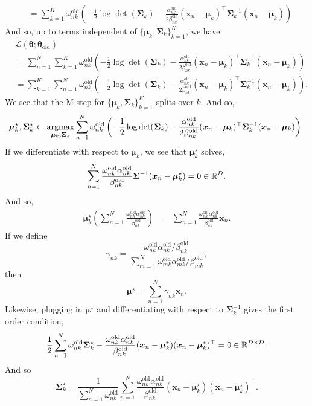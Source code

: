 \begin{enumerate}[label = (\alph*)]
\begin{align*}
        &=\sum_{k=1}^K \omega_{nk}^{\mathrm{old}}\left(-\frac{1}{2}\log \det(\bm{\Sigma}_k) - \frac{\alpha_{nk}^{\mathrm{old}}}{2\beta_{nk}^{\mathrm{old}}}(\bm{x}_n - \bm{\mu}_k)^\top \bm{\Sigma}_k^{-1}(\bm{x}_n - \bm{\mu}_k) \right)
    \end{align*}
    And so, up to terms independent of $\{\bm{\mu}_k,\bm{\Sigma}_k\}_{k=1}^K$, we have
    \begin{align*}
        &\mathcal{L}(\bm{\theta};\bm{\theta}_{\mathrm{old}})\\
        &=\sum_{n=1}^N\sum_{k=1}^K  \omega_{nk}^{\mathrm{old}}\left(-\frac{1}{2}\log \det(\bm{\Sigma}_k) - \frac{\alpha_{nk}^{\mathrm{old}}}{2\beta_{nk}^{\mathrm{old}}}(\bm{x}_n - \bm{\mu}_k)^\top \bm{\Sigma}_k^{-1}(\bm{x}_n - \bm{\mu}_k) \right)\\
        &=\sum_{k=1}^K\sum_{n=1}^N \omega_{nk}^{\mathrm{old}}\left(-\frac{1}{2}\log \det(\bm{\Sigma}_k) - \frac{\alpha_{nk}^{\mathrm{old}}}{2\beta_{nk}^{\mathrm{old}}}(\bm{x}_n - \bm{\mu}_k)^\top \bm{\Sigma}_k^{-1}(\bm{x}_n - \bm{\mu}_k) \right).
    \end{align*}
    We see that the M-step for $\{\bm{\mu}_k,\bm{\Sigma}_k\}_{k=1}^K$ splits over $k$. And so,
    \[\bm{\mu}_k^\star,\bm{\Sigma}_k^\star \gets \operatorname*{argmax}_{\bm{\mu}_k,\bm{\Sigma}_k} \sum_{n=1}^N \omega_{nk}^{\mathrm{old}}\left(-\frac{1}{2}\log \det(\bm{\Sigma}_k) - \frac{\alpha_{nk}^{\mathrm{old}}}{2\beta_{nk}^{\mathrm{old}}}(\bm{x}_n - \bm{\mu}_k)^\top \bm{\Sigma}_k^{-1}(\bm{x}_n - \bm{\mu}_k) \right). \]
    If we differentiate with respect to $\bm{\mu}_k$, we see that $\bm{\mu}_k^\star$ solves,
    \[\sum_{n=1}^N \frac{\omega_{nk}^{\mathrm{old}}\alpha_{nk}^{\mathrm{old}}}{\beta_{nk}^{\mathrm{old}}}\bm{\Sigma}^{-1} (\bm{x}_n-\bm{\mu}_k^\star)=0\in \mathbb{R}^D. \]
    And so,
    \begin{align*}
       \bm{\mu}_k^\star \left(\sum_{n=1}^N \frac{\omega_{nk}^{\mathrm{old}}\alpha_{nk}^{\mathrm{old}}}{\beta_{nk}^{\mathrm{old}}}\right) &= \sum_{n=1}^N \frac{\omega_{nk}^{\mathrm{old}}\alpha_{nk}^{\mathrm{old}}}{\beta_{nk}^{\mathrm{old}}} \bm{x}_n.
    \end{align*}
    If we define 
    \[\gamma_{nk} = \frac{\omega_{nk}^{\mathrm{old}}\alpha_{nk}^{\mathrm{old}}/\beta_{nk}^{\mathrm{old}}}{\sum_{m=1}^N \omega_{mk}^{\mathrm{old}}\alpha_{mk}^{\mathrm{old}}/\beta_{mk}^{\mathrm{old}}}, \]
    then 
    \[ \bm{\mu}^\star = \sum_{n=1}^N \gamma_{nk} \bm{x}_n.\]
    Likewise, plugging in $\bm{\mu}^\star$ and differentiating with respect to $\bm{\Sigma}_k^{-1}$ gives the first order condition,
    \[\frac{1}{2}\sum_{n=1}^N \omega_{nk}^{\text{old}}\bm{\Sigma}_k^\star - \frac{\omega_{nk}^{\mathrm{old}}\alpha_{nk}^{\mathrm{old}}}{\beta_{nk}^{\mathrm{old}}}(\bm{x}_n-\bm{\mu}_k^\star)(\bm{x}_n - \bm{\mu}_k^\star)^\top = 0 \in \mathbb{R}^{D \times D}. \]
    And so
    \[\bm{\Sigma}_k^\star = \frac{1}{\sum_{n=1}^N \omega_{nk}^\text{old}} \sum_{n=1}^N \frac{\omega_{nk}^{\mathrm{old}}\alpha_{nk}^{\mathrm{old}}}{\beta_{nk}^{\mathrm{old}}}(\bm{x}_n-\bm{\mu}_k^\star)(\bm{x}_n - \bm{\mu}_k^\star)^\top.  \]
\end{enumerate}
